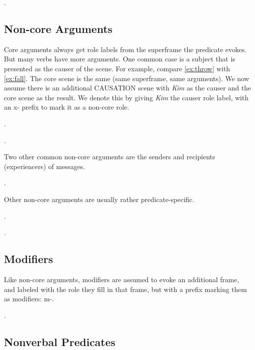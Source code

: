 \documentclass[a4paper]{article}
\newcommand{\fr}[1]{\textsf{#1}}
\newcommand{\rl}[1]{\textsf{#1}}
\begin{document}
\ex.

\newpage\subsection{Non-core Arguments}

Core arguments always get role labels from the superframe the predicate evokes.
But many verbs have more arguments. One common case is a subject that is
presented as the causer of the scene. For example, compare \ref{ex:throw} with
\ref{ex:fall}. The core scene is the same (same superframe, same arguments). We
now assume there is an additional \fr{CAUSATION} scene with \emph{Kim} as the
\rl{causer} and the core scene as the \rl{result}. We denote this by giving
\emph{Kim} the \rl{causer} role label, with an \rl{x-} prefix to mark it as a
non-core role.

\ex.\label{ex:throw}

\ex.

Two other common non-core arguments are the senders and recipients (experiencers) of messages.

\ex.

Other non-core arguments are usually rather predicate-specific.

\ex.

\ex.

\newpage\subsection{Modifiers}

Like non-core arguments, modifiers are assumed to evoke an additional frame,
and labeled with the role they fill in that frame, but with a prefix marking
them as modifiers: \rl{m-}.

\ex.

\newpage\subsection{Nonverbal Predicates}
\end{document}
